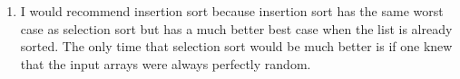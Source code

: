 \documentclass{article}
\begin{document}
\begin{enumerate}
		
		\item I would recommend insertion sort because insertion sort has the same worst case as selection sort but has a much better best case when the list is already sorted. The only time that selection sort would be much better is if one knew that the input arrays were always perfectly random. 
	\end{enumerate}
\end{document}
